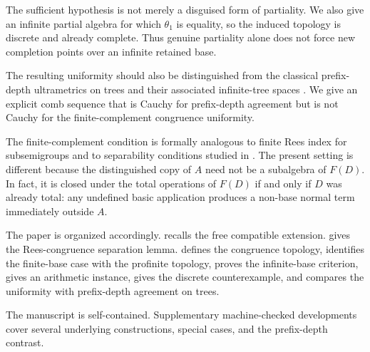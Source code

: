 The sufficient hypothesis is not merely a disguised form of partiality.  We
also give an infinite partial algebra for which $\theta_1$ is equality, so the
induced topology is discrete and already complete.  Thus genuine partiality
alone does not force new completion points over an infinite retained base.

The resulting uniformity should also be distinguished from the classical
prefix-depth ultrametrics on trees and their associated infinite-tree spaces
\cite{ArnoldNivat1980,Courcelle1983}.  We give an explicit comb sequence that
is Cauchy for prefix-depth agreement but is not Cauchy for the
finite-complement congruence uniformity.

The finite-complement condition is formally analogous to finite Rees index for
subsemigroups \cite{RuskucThomas1998,CainMaltcev2013} and to separability
conditions studied in \cite{MillerOReillyQuickRuskuc2022}.  The present setting
is different because the distinguished copy of $A$ need not be a subalgebra of
$F(D)$.  In fact, it is closed under the total operations of $F(D)$ if and only
if $D$ was already total: any undefined basic application produces a non-base
normal term immediately outside $A$.

The paper is organized accordingly.   recalls the free
compatible extension.   gives the Rees-congruence
separation lemma.   defines the congruence topology,
identifies the finite-base case with the profinite topology, proves the
infinite-base criterion, gives an arithmetic instance, gives the discrete
counterexample, and compares the uniformity with prefix-depth agreement on
trees.

The manuscript is self-contained.  Supplementary machine-checked developments
cover several underlying constructions, special cases, and the prefix-depth
contrast.
